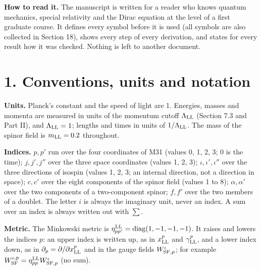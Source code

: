 \documentclass[
  10pt,
]{article}
\begin{document}
\textbf{How to read it.} The manuscript is written for a reader who
knows quantum mechanics, special relativity and the Dirac equation at
the level of a first graduate course. It defines every symbol before it
is used (all symbols are also collected in Section 18), shows every step
of every derivation, and states for every result how it was checked.
Nothing is left to another document.

\hypertarget{conventions-units-and-notation}{%
\section{1. Conventions, units and
notation}\label{conventions-units-and-notation}}

\textbf{Units.} Planck's constant and the speed of light are 1.
Energies, masses and momenta are measured in units of the momentum
cutoff \(\Lambda_{\rm LL}\) (Section 7.3 and Part II), and
\(\Lambda_{\rm LL}=1\); lengths and times in units of
\(1/\Lambda_{\rm LL}\). The mass of the spinor field is
\(m_{\rm LL}=0.2\) throughout.

\textbf{Indices.} \(p,p'\) run over the four coordinates of M31 (values
0, 1, 2, 3; 0 is the time); \(j,j',j''\) over the three space
coordinates (values 1, 2, 3); \(\iota,\iota',\iota''\) over the three
directions of isospin (values 1, 2, 3; an internal direction, not a
direction in space); \(c,c'\) over the eight components of the spinor
field (values 1 to 8); \(\alpha,\alpha'\) over the two components of a
two-component spinor; \(f,f'\) over the two members of a doublet. The
letter \(i\) is always the imaginary unit, never an index. A sum over an
index is always written out with \(\sum\).

\textbf{Metric.} The Minkowski metric is
\(\eta^{\rm LL}_{pp'}=\mathrm{diag}(1,-1,-1,-1)\). It raises and lowers
the indices \(p\): an upper index is written up, as in \(x^p_{\rm LL}\)
and \(\gamma^p_{\rm LL}\), and a lower index down, as in
\(\partial_p=\partial/\partial x^p_{\rm LL}\) and in the gauge fields
\(W^\iota_{{\rm SF},p}\); for example
\(W^{\iota,p}_{\rm SF}=\eta^{\rm LL}_{pp}W^\iota_{{\rm SF},p}\) (no
sum).
\end{document}
